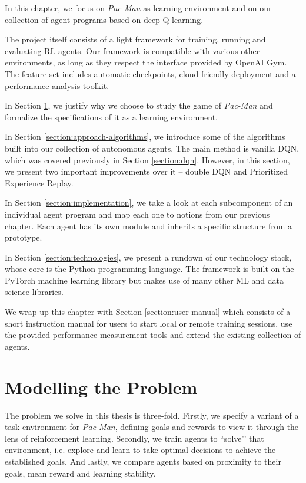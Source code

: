 In this chapter, we focus on \emph{Pac-Man} as learning environment and on our collection of agent programs based on deep Q-learning.

The project itself consists of a light framework for training, running and evaluating RL agents.
Our framework is compatible with various other environments, as long as they respect the interface provided by OpenAI Gym.
The feature set includes automatic checkpoints, cloud-friendly deployment and a performance analysis toolkit.

In Section \ref{section:modelling-the-problem}, we justify why we choose to study the game of \emph{Pac-Man} and formalize the specifications of it as a learning environment.

In Section \ref{section:approach-algorithms}, we introduce some of the algorithms built into our collection of autonomous agents.
The main method is vanilla DQN, which was covered previously in Section \ref{section:dqn}.
However, in this section, we present two important improvements over it -- double DQN and Prioritized Experience Replay.

In Section \ref{section:implementation}, we take a look at each subcomponent of an individual agent program and map each one to notions from our previous chapter.
Each agent has its own module and inherits a specific structure from a prototype.

In Section \ref{section:technologies}, we present a rundown of our technology stack, whose core is the Python programming language. The framework is built on the PyTorch machine learning library but makes use of many other ML and data science libraries.

We wrap up this chapter with Section \ref{section:user-manual} which consists of a short instruction manual for users to start local or remote training sessions, use the provided performance measurement tools and extend the existing collection of agents.

\clearpage

\section{Modelling the Problem} \label{section:modelling-the-problem}
The problem we solve in this thesis is three-fold.
Firstly, we specify a variant of a task environment for \emph{Pac-Man}, defining goals and rewards to view it through the lens of reinforcement learning.
Secondly, we train agents to ``solve’’ that environment, i.e. explore and learn to take optimal decisions to achieve the established goals.
And lastly, we compare agents based on proximity to their goals, mean reward and learning stability.

